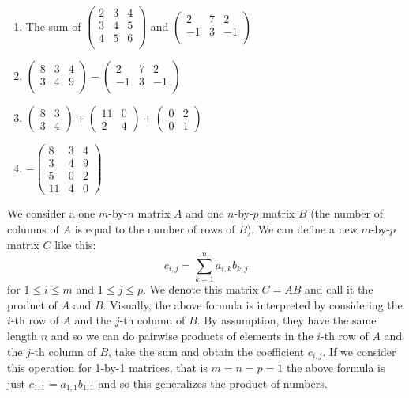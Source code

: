 \begin{enumerate}
\item The sum of $\begin{pmatrix}
  2 & 3 & 4 \\
  3 & 4 & 5 \\
  4 & 5 & 6 \\
\end{pmatrix}$ and $\begin{pmatrix}
  2 & 7 & 2 \\
  -1 & 3 & -1 \\
\end{pmatrix}$

\item $\begin{pmatrix}
  8 & 3 & 4 \\
  3 & 4 & 9 \\
\end{pmatrix} - \begin{pmatrix}
  2 & 7 & 2 \\
  -1 & 3 & -1 \\
\end{pmatrix}$

\item $\begin{pmatrix}
  8 & 3 \\
  3 & 4
\end{pmatrix} + \begin{pmatrix}
  11 & 0 \\
  2 & 4
\end{pmatrix} + \begin{pmatrix}
  0 & 2 \\
  0 & 1
\end{pmatrix}$

\item $-\begin{pmatrix}
  8 & 3 & 4 \\
  3 & 4 & 9 \\
  5 & 0 & 2 \\
  11 & 4 & 0
\end{pmatrix}$
\end{enumerate}

We consider a one $m$-by-$n$ matrix $A$ and one $n$-by-$p$ matrix $B$
(the number of
columns of $A$ is equal to the number of rows of $B$). We can define a new
$m$-by-$p$ matrix $C$ like this:
      $$c_{i,j} = \sum_{k=1}^n a_{i,k} b_{k,j}$$
for $1\leq i \leq m$ and $1\leq j \leq p$. We denote this matrix $C = A B$ and
call it the product of $A$ and $B$. Visually, the above formula is interpreted
by considering the $i$-th row of $A$ and the $j$-th column of $B$. By
assumption, they have the same length $n$ and so we can do pairwise products of
elements in the $i$-th row of $A$ and the $j$-th column of $B$, take the sum and
obtain the coefficient $c_{i,j}$. If we consider this operation for 1-by-1
matrices, that is $m = n = p = 1$ the above formula is just
$c_{1,1} = a_{1,1} b_{1,1}$ and so this generalizes the product of numbers.

